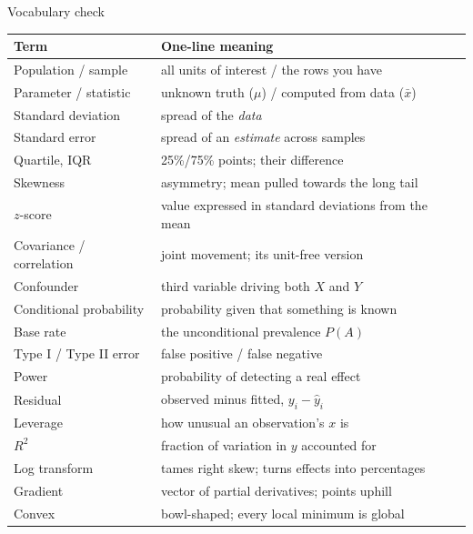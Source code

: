 \documentclass[aspectratio=169,11pt]{beamer}
\begin{document}
\begin{frame}{Vocabulary check}
  \scriptsize
  \renewcommand{\arraystretch}{0.95}
  \begin{center}
  \begin{tabular}{@{}ll@{}}
    \toprule
    \textbf{Term} & \textbf{One-line meaning} \\
    \midrule
    Population / sample & all units of interest / the rows you have \\
    Parameter / statistic & unknown truth ($\mu$) / computed from data ($\bar x$) \\
    Standard deviation & spread of the \emph{data} \\
    Standard error & spread of an \emph{estimate} across samples \\
    Quartile, IQR & 25\%/75\% points; their difference \\
    Skewness & asymmetry; mean pulled towards the long tail \\
    $z$-score & value expressed in standard deviations from the mean \\
    Covariance / correlation & joint movement; its unit-free version \\
    Confounder & third variable driving both $X$ and $Y$ \\
    Conditional probability & probability given that something is known \\
    Base rate & the unconditional prevalence $P(A)$ \\
    Type I / Type II error & false positive / false negative \\
    Power & probability of detecting a real effect \\
    Residual & observed minus fitted, $y_i - \hat y_i$ \\
    Leverage & how unusual an observation's $x$ is \\
    $R^2$ & fraction of variation in $y$ accounted for \\
    Log transform & tames right skew; turns effects into percentages \\
    Gradient & vector of partial derivatives; points uphill \\
    Convex & bowl-shaped; every local minimum is global \\
    \bottomrule
  \end{tabular}
  \end{center}
\end{frame}
\end{document}
